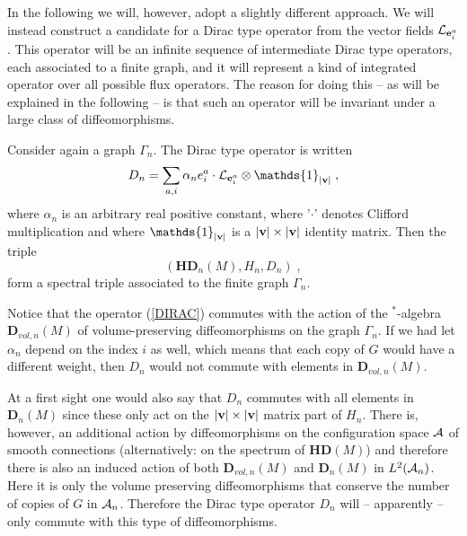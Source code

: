 \documentclass[12pt]{article}
\def\a{\alpha}
\def\G{\Gamma}
\def\ca{{\cal A}}
\def\cl{{\cal L}}
\begin{document}
In the following we will, however, adopt a slightly different approach. We will instead construct a candidate for a Dirac type operator from the vector fields $\cl_{{\bf e}_i^a}$. This operator will be an infinite sequence of intermediate Dirac type operators, each associated to a finite graph, and it will represent a kind of integrated operator over all possible flux operators. The reason for doing this -- as will be explained in the following -- is that such an operator will be invariant under a large class of diffeomorphisms. 

Consider again a graph $\G_n$. The Dirac type operator is written
\begin{equation}
D_n = \sum_{a,i} \a_n e_i^a \cdot \cl_{{\bf e}_i^a} \otimes \mathds{1}_{\vert {\bf v}  \vert }  \;,
\label{DIRAC}
\end{equation}
where $\a_n$ is an arbitrary real positive constant, where '$\cdot$' denotes Clifford multiplication and where $\mathds{1}_{\vert {\bf v}\vert}$ is a $\vert {\bf v}  \vert \times \vert {\bf v}  \vert $ identity matrix.  %
Then the triple
\begin{equation}
(\mathbf{HD}_n(M) ,H_n,D_n)\;,
\label{diracie}
\end{equation}
form a spectral triple associated to the finite graph $\G_n$. 





 Notice that the operator (\ref{DIRAC}) commutes with the action of the $^*$-algebra $\mathbf{D}_{vol,n}(M)$ of volume-preserving diffeomorphisms  on the graph $\G_n$. %
If we had let $\a_n$ depend on the index $i$ as well, which means that each copy of $G$ would have a different weight, then $D_n$ would not commute with elements in $\mathbf{D}_{vol,n}(M) $. 

At a first sight one would also say that $D_n$ commutes with all elements in  $\mathbf{D}_{n}(M) $ since these only act on the $\vert {\bf v}  \vert \times \vert {\bf v}  \vert $ matrix part of $H_n$. There is, however, an additional action by diffeomorphisms on the configuration space $\ca$ of smooth connections (alternatively: on the spectrum of $\mathbf{HD}(M)$) and therefore there is also an induced action of both $\mathbf{D}_{vol,n}(M) $ and $\mathbf{D}_{n}(M) $ in $L^2(\ca_n)$. Here it is only the volume preserving diffeomorphisms that conserve the number of copies of $G$ in $\ca_n$. Therefore the Dirac type operator $D_n$ will -- apparently -- only commute with this type of diffeomorphisms.
\end{document}
